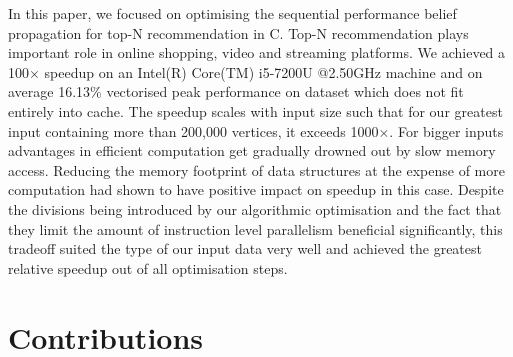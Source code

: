 \documentclass[draft,letterpaper]{article}
\begin{document}
In this paper, we focused on optimising the sequential performance belief propagation for top-N recommendation in C.
Top-N recommendation plays important role in online shopping, video and streaming platforms. 
We achieved a 100$\times$ speedup on an Intel(R) Core(TM) i5-7200U @2.50GHz machine and on average 16.13\% vectorised peak performance on dataset which does not fit entirely into cache.
The speedup scales with input size such that for our greatest input containing more than 200,000 vertices, it exceeds 1000$\times$.
For bigger inputs advantages in efficient computation get gradually drowned out by slow memory access.
Reducing the memory footprint of data structures at the expense of more computation had shown to have positive impact on speedup in this case.
Despite the divisions being introduced by our algorithmic optimisation and the fact that they limit the amount of instruction level parallelism beneficial significantly, this tradeoff suited the type of our input data very well and achieved the greatest relative speedup out of all optimisation steps.\sr{*}
\sr{*}


\section{Contributions}%

\end{document}
